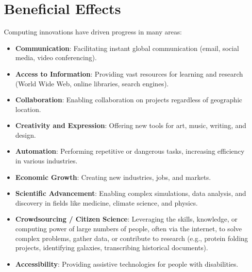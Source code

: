 \documentclass[11pt,oneside]{book}
\begin{document}
\section{Beneficial Effects}
\label{sec:beneficial_effects}
Computing innovations have driven progress in many areas:
\begin{itemize}
    \item \textbf{Communication}: Facilitating instant global communication (email, social media, video conferencing).
    \item \textbf{Access to Information}: Providing vast resources for learning and research (World Wide Web, online libraries, search engines).
    \item \textbf{Collaboration}: Enabling collaboration on projects regardless of geographic location.
    \item \textbf{Creativity and Expression}: Offering new tools for art, music, writing, and design.
    \item \textbf{Automation}: Performing repetitive or dangerous tasks, increasing efficiency in various industries.
    \item \textbf{Economic Growth}: Creating new industries, jobs, and markets.
    \item \textbf{Scientific Advancement}: Enabling complex simulations, data analysis, and discovery in fields like medicine, climate science, and physics.
    \item \textbf{Crowdsourcing / Citizen Science}: Leveraging the skills, knowledge, or computing power of large numbers of people, often via the internet, to solve complex problems, gather data, or contribute to research (e.g., protein folding projects, identifying galaxies, transcribing historical documents).
    \item \textbf{Accessibility}: Providing assistive technologies for people with disabilities.
\end{itemize}
\end{document}
